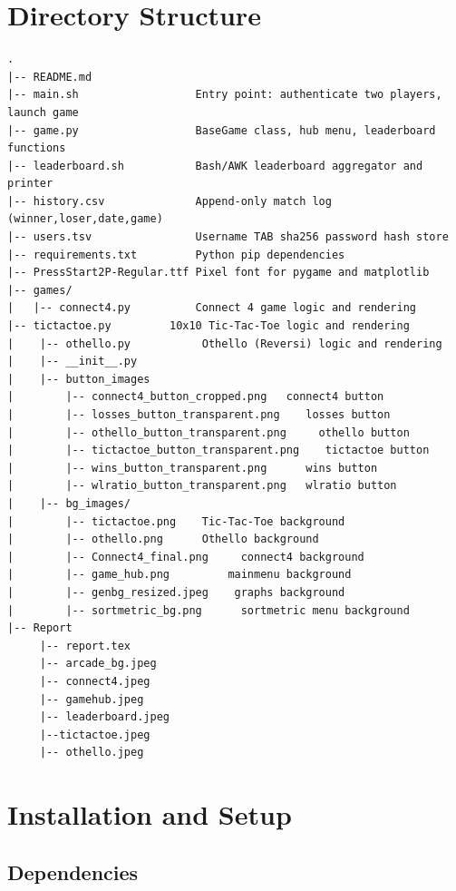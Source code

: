 \documentclass[12pt,a4paper]{article}
\begin{document}
\section{Directory Structure}
\begin{mdframed}
\begin{footnotesize}
\begin{verbatim}
.
|-- README.md
|-- main.sh                  Entry point: authenticate two players, launch game
|-- game.py                  BaseGame class, hub menu, leaderboard functions
|-- leaderboard.sh           Bash/AWK leaderboard aggregator and printer
|-- history.csv              Append-only match log (winner,loser,date,game)
|-- users.tsv                Username TAB sha256 password hash store
|-- requirements.txt         Python pip dependencies
|-- PressStart2P-Regular.ttf Pixel font for pygame and matplotlib
|-- games/
|   |-- connect4.py          Connect 4 game logic and rendering
|-- tictactoe.py         10x10 Tic-Tac-Toe logic and rendering
|    |-- othello.py           Othello (Reversi) logic and rendering
|    |-- __init__.py
|    |-- button_images
|        |-- connect4_button_cropped.png   connect4 button
|        |-- losses_button_transparent.png    losses button
|        |-- othello_button_transparent.png     othello button
|        |-- tictactoe_button_transparent.png    tictactoe button
|        |-- wins_button_transparent.png      wins button
|        |-- wlratio_button_transparent.png   wlratio button
|    |-- bg_images/
|        |-- tictactoe.png    Tic-Tac-Toe background
|        |-- othello.png      Othello background
|        |-- Connect4_final.png     connect4 background
|        |-- game_hub.png         mainmenu background
|        |-- genbg_resized.jpeg    graphs background
|        |-- sortmetric_bg.png      sortmetric menu background
|-- Report
     |-- report.tex
     |-- arcade_bg.jpeg
     |-- connect4.jpeg
     |-- gamehub.jpeg
     |-- leaderboard.jpeg
     |--tictactoe.jpeg
     |-- othello.jpeg
\end{verbatim}
\end{footnotesize}
\end{mdframed}
 

\section{Installation and Setup}

 
\subsection{Dependencies}
 
\end{document}
